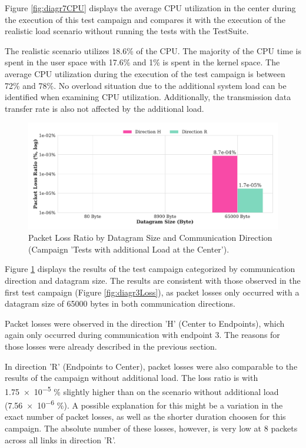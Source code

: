Figure \ref{fig:diagr7CPU} displays the average CPU utilization in the center during the execution of this test campaign and compares it with the execution of the realistic load scenario without running the tests with the TestSuite.

The realistic scenario utilizes 18.6\% of the CPU. The majority of the CPU time is spent in the user space with 17.6\% and 1\% is spent in the kernel space. The average CPU utilization during the execution of the test campaign is between 72\% and 78\%. No overload situation due to the additional system load can be identified when examining CPU utilization. Additionally, the transmission data transfer rate is also not affected by the additional load.

\begin{figure}[h]
    \centering
    \includegraphics[width=1\linewidth]{figures/reliability/ihawk/diagr8.pdf}
    \caption{Packet Loss Ratio by Datagram Size and Communication Direction (Campaign 'Tests with additional Load at the Center').}
    \label{fig:diagr8Loss}
\end{figure}

Figure \ref{fig:diagr8Loss} displays the results of the test campaign categorized by communication direction and datagram size. The results are consistent with those observed in the first test campaign (Figure \ref{fig:diagr3Loss}), as packet losses only occurred with a datagram size of 65000 bytes in both communication directions.

Packet losses were observed in the direction 'H' (Center to Endpoints), which again only occurred during communication with endpoint 3. The reasons for those losses were already described in the previous section.

In direction 'R' (Endpoints to Center), packet losses were also comparable to the results of the campaign without additional load. The loss ratio is with \num{1.75e-5} \% slightly higher than on the scenario without additional load (\num{7.56e-6} \%). A possible explanation for this might be a variation in the exact number of packet losses, as well as the shorter duration choosen for this campaign. The absolute number of these losses, however, is very low at 8 packets across all links in direction 'R'.

